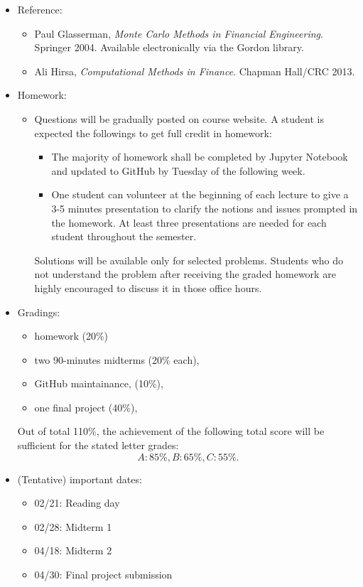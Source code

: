 \documentclass[11pt]{amsart}
\begin{document}
\begin{itemize}
\item Reference:
\begin{itemize}
\item Paul Glasserman, \textit{Monte Carlo Methods in Financial Engineering}. Springer 2004. Available electronically via the Gordon library.
 \item Ali Hirsa, \textit{Computational Methods in Finance}. Chapman Hall/CRC 2013. 
\end{itemize}

\item Homework: 
\begin{itemize}\item  
Questions will be gradually 
posted on course website. 
A student is expected the followings to get full credit in homework:
\begin{itemize}
\item The majority of homework shall be completed by Jupyter Notebook and updated to GitHub by Tuesday of the following week.
\item One student can volunteer at the beginning of each lecture
to give a 3-5 minutes presentation 
to clarify the notions and issues prompted in the homework. 
At least three presentations are needed for each student 
throughout the semester.
\end{itemize}
Solutions will be available only for selected problems. Students who do not understand the problem after receiving the graded homework are {highly encouraged} to discuss it in those office hours. 
\end{itemize}

\item Gradings:
\begin{itemize}
 \item
 homework (20\%)
 \item 
 two 90-minutes midterms (20\% each), 
 \item GitHub maintainance, (10\%), 
 \item one final project (40\%), 
\end{itemize}
Out of total 110\%, the achievement of the following total score will be sufficient for the stated letter grades:
$$A: 85\%, B: 65\%, C: 55\%.$$

\item (Tentative) important dates:
\begin{itemize}
 \item 02/21: Reading day
 \item 02/28: Midterm 1
 \item 04/18: Midterm 2
 \item 04/30: Final project submission
\end{itemize}


\end{itemize}
\end{document}
